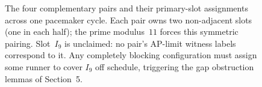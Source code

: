 \begin{figure}[ht]
\caption{The four complementary pairs and their primary-slot assignments across one
pacemaker cycle. Each pair owns two non-adjacent slots (one in each half); the prime
modulus~$11$ forces this symmetric pairing. Slot~$I_9$ is unclaimed: no pair's
AP-limit witness labels correspond to it. Any completely blocking configuration must
assign some runner to cover $I_9$ off schedule, triggering the gap obstruction lemmas
of Section~5.}
\label{fig:slot-ownership}
\end{figure}
